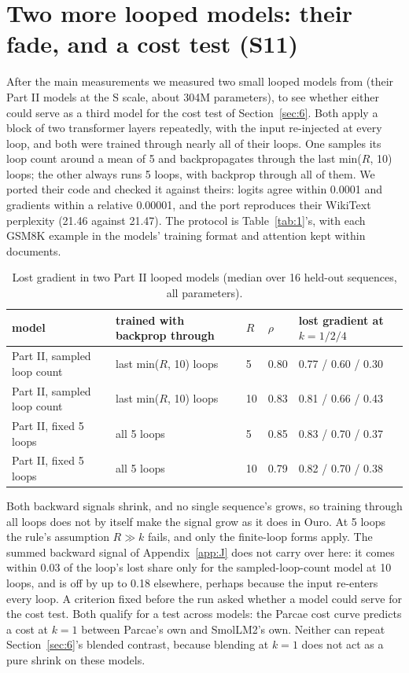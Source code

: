 \documentclass[10pt]{article}
\begin{document}
\section{Two more looped models: their fade, and a cost test (S11)}\label{app:H}

After the main measurements we measured two small looped models from \citet{huang2026partii} (their Part II models at the S scale, about 304M parameters), to see whether either could serve as a third model for the cost test of Section~\ref{sec:6}. Both apply a block of two transformer layers repeatedly, with the input re-injected at every loop, and both were trained through nearly all of their loops. One samples its loop count around a mean of 5 and backpropagates through the last min($R$, 10) loops; the other always runs 5 loops, with backprop through all of them. We ported their code and checked it against theirs: logits agree within 0.0001 and gradients within a relative 0.00001, and the port reproduces their WikiText perplexity (21.46 against 21.47). The protocol is Table~\ref{tab:1}'s, with each GSM8K example in the models' training format and attention kept within documents.

\begin{table}[!htbp]
\centering\small
\caption{Lost gradient in two Part II looped models (median over 16 held-out sequences, all parameters).}
\begin{tabular}{lllll}
\toprule
model & trained with backprop through & $R$ & $\rho$ & lost gradient at $k = 1 / 2 / 4$ \\
\midrule
Part II, sampled loop count & last min($R$, 10) loops & 5 & 0.80 & 0.77 / 0.60 / 0.30 \\
Part II, sampled loop count & last min($R$, 10) loops & 10 & 0.83 & 0.81 / 0.66 / 0.43 \\
Part II, fixed 5 loops & all 5 loops & 5 & 0.85 & 0.83 / 0.70 / 0.37 \\
Part II, fixed 5 loops & all 5 loops & 10 & 0.79 & 0.82 / 0.70 / 0.38 \\
\bottomrule
\end{tabular}
\label{tab:8}
\end{table}


Both backward signals shrink, and no single sequence's grows, so training through all loops does not by itself make the signal grow as it does in Ouro. At 5 loops the rule's assumption $R \gg  k$ fails, and only the finite-loop forms apply. The summed backward signal of Appendix~\ref{app:J} does not carry over here: it comes within 0.03 of the loop's lost share only for the sampled-loop-count model at 10 loops, and is off by up to 0.18 elsewhere, perhaps because the input re-enters every loop. A criterion fixed before the run asked whether a model could serve for the cost test. Both qualify for a test across models: the Parcae cost curve predicts a cost at $k = 1$ between Parcae's own and SmolLM2's own. Neither can repeat Section~\ref{sec:6}'s blended contrast, because blending at $k = 1$ does not act as a pure shrink on these models.
\end{document}
